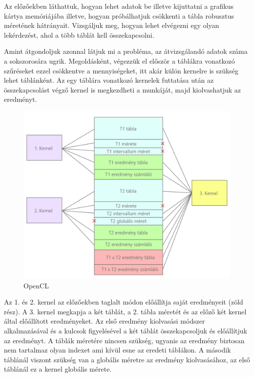 
Az előzőekben láthattuk, hogyan lehet adatok be illetve kijuttatni a grafikus kártya memóriájába illetve, hogyan próbálhatjuk csökkenti a tábla robusztus méretének hátrányait.
Vizsgáljuk meg, hogyan lehet elvégezni egy olyan lekérdezést, ahol a több táblát kell összekapcsolni.

Amint átgondoljuk azonnal látjuk mi a probléma, az átvizsgálandó adatok száma a sokszorosára ugrik. Megoldásként, végezzük el először a táblákra vonatkozó szűréseket ezzel csökkentve a mennyiségeket, itt akár külön kernelre is szükség lehet táblánként.
Az egy táblára vonatkozó kernelek futtatása után az összekapcsolást végző kernel is megkezdheti a munkáját, majd kiolvashatjuk az eredményt.

\begin{figure}[h!]
\centering
\includegraphics[width=12cm]{images/join_kernels.png}
\caption{OpenCL}
\label{fig:opencl}
\end{figure}

Az 1. és 2. kernel az előzőekben taglalt módon előállítja saját eredményeit (zöld rész). 
A 3. kernel megkapja a két táblát, a 2. tábla méretét és az előző két kernel által előállított eredményeket.
Az első eredmény kiolvasási módszer alkalmazásával és a kulcsok figyelésével a két táblát összekapcsoljuk és előállítjuk az eredményt.
A táblák méretére nincsen szükség, ugyanis az eredmény biztosan nem tartalmaz olyan indexet ami kívül esne az eredeti táblákon. A második táblánál viszont szükség van a globális méretre az eredmény kiolvasásához, az első táblánál ez a kernel globális mérete.


